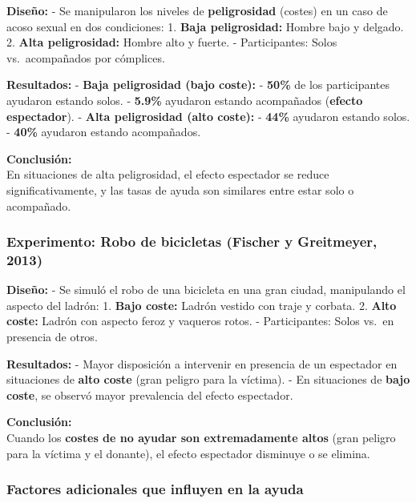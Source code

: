 \documentclass[
]{book}
\begin{document}
\textbf{Diseño:}
- Se manipularon los niveles de \textbf{peligrosidad} (costes) en un caso de acoso sexual en dos condiciones:
1. \textbf{Baja peligrosidad:} Hombre bajo y delgado.
2. \textbf{Alta peligrosidad:} Hombre alto y fuerte.
- Participantes: Solos vs.~acompañados por cómplices.

\textbf{Resultados:}
- \textbf{Baja peligrosidad (bajo coste):}
- \textbf{50\%} de los participantes ayudaron estando solos.
- \textbf{5.9\%} ayudaron estando acompañados (\textbf{efecto espectador}).
- \textbf{Alta peligrosidad (alto coste):}
- \textbf{44\%} ayudaron estando solos.
- \textbf{40\%} ayudaron estando acompañados.

\textbf{Conclusión:}\\
En situaciones de alta peligrosidad, el efecto espectador se reduce significativamente, y las tasas de ayuda son similares entre estar solo o acompañado.

\subsubsection{\texorpdfstring{\textbf{Experimento: Robo de bicicletas (Fischer y Greitmeyer, 2013)}}{Experimento: Robo de bicicletas (Fischer y Greitmeyer, 2013)}}\label{experimento-robo-de-bicicletas-fischer-y-greitmeyer-2013}

\textbf{Diseño:}
- Se simuló el robo de una bicicleta en una gran ciudad, manipulando el aspecto del ladrón:
1. \textbf{Bajo coste:} Ladrón vestido con traje y corbata.
2. \textbf{Alto coste:} Ladrón con aspecto feroz y vaqueros rotos.
- Participantes: Solos vs.~en presencia de otros.

\textbf{Resultados:}
- Mayor disposición a intervenir en presencia de un espectador en situaciones de \textbf{alto coste} (gran peligro para la víctima).
- En situaciones de \textbf{bajo coste}, se observó mayor prevalencia del efecto espectador.

\textbf{Conclusión:}\\
Cuando los \textbf{costes de no ayudar son extremadamente altos} (gran peligro para la víctima y el donante), el efecto espectador disminuye o se elimina.

\subsubsection{Factores adicionales que influyen en la ayuda}\label{factores-adicionales-que-influyen-en-la-ayuda}
\end{document}
